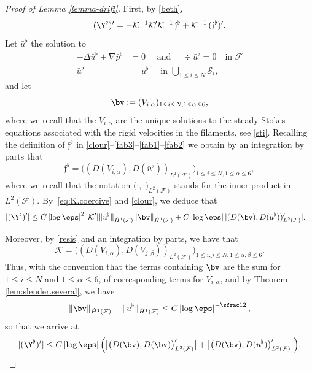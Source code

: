 \begin{proof}[Proof of Lemma \ref{lemma-drift}]
First, by \eqref{beth},
\begin{equation}
(\Y^\flat)'
= - \mathcal K^{-1} \mathcal K' \mathcal K^{-1} \, \mathfrak{f}^\flat + \mathcal K^{-1} \, (\mathfrak{f}^\flat)'.
\end{equation}
Let $\bar u^\flat$ the solution to
\begin{align*}
- \Delta \bar u^\flat + \nabla \bar p^\flat &= 0 \quad \text{ and }\quad \div {\bar u^\flat} = 0 \quad \text{in } \mathcal F \\
\bar u^\flat &= u^\flat \quad \text{ in } \bigcup_{1 \leq i \leq N} \mathcal S_i,
\end{align*}
and let
\[
\bv := (V_{i,\alpha})_{1\leq i \leq N, 1 \leq \alpha \leq 6},\]
where we recall that the $ V_{i,\alpha}$ are the unique solutions to the steady Stokes equations associated with the rigid velocities in the filaments, see \eqref{sti}.
Recalling the definition of $ \mathfrak{f}^\flat $ in \eqref{clour}--\eqref{fab3}--\eqref{fab1}--\eqref{fab2}
we obtain by an integration by parts that
\begin{equation*}
\mathfrak{f}^\flat = \Big((D (V_{i,\alpha}),D (\bar u^\flat))_{L^2(\mathcal F)} \Big)_{1\leq i \leq N, 1 \leq \alpha \leq 6},
\end{equation*}
where we recall that the notation $\big(\cdot, \cdot\big)_{L^2(\mathcal F)}$ stands for the inner product in $L^2(\mathcal F)$.
By~\eqref{eq:K.coercive} and \eqref{clour},
we deduce that
\begin{equation}
\begin{aligned}
|(\Y^\flat)'| &\leq C \left|\log \eps\right|^2 |\mathcal K'| \| \bar u^\flat\|_{\dot H^1(\mathcal F)} \|\bv\|_{\dot H^1(\mathcal F)}
+ C \left|\log \eps\right| |(D (\bv), D (\bar u^\flat))'_{L^2(\mathcal F)}|.
\end{aligned}
\end{equation}

Moreover, by \eqref{resis} and an integration by parts, we have that
\begin{equation*}
\mathcal K = \Big((D (V_{i,\alpha}),D (V_{j,\beta}))_{L^2(\mathcal F)} \Big)_{1\leq i,j \leq N, 1 \leq \alpha,\beta \leq 6}.
\end{equation*}
Thus, with the convention that the terms containing $\bv$ are the sum for $1\leq i \leq N$ and $ 1 \leq \alpha \leq 6$, of corresponding terms for $V_{i,\alpha}$,
and by Theorem \ref{lem:slender.several}, we have
\[
\|\bv \|_{\dot H^1(\mathcal F)}
+ \| \bar u^\flat \|_{\dot H^1(\mathcal F)}
\leq C \left|\log \eps\right|^{-\sfrac12},\]
so that we arrive at
\begin{equation} \label{est:s..}
|(\Y^\flat)'| \leq C \left|\log \eps\right| \Bigl(\bigl|\big(D (\bv),
D (\bv)\big)_{L^2(\mathcal F)}'\bigr|
+ \bigl|\big(D(\bv), D (\bar u^\flat)\big)'_{L^2(\mathcal F)}\bigr|
\Bigr).
\end{equation}


\end{proof}
